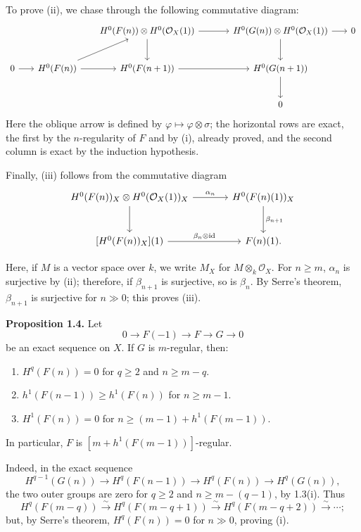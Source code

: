 To prove (ii), we chase through the following commutative diagram:
\[
\begin{tikzcd}[column sep=1.7em,row sep=2.4em]
  & & H^0(F(n))\otimes H^0(\mathcal O_X(1))
      \arrow[rr] \arrow[d]
  & & H^0(G(n))\otimes H^0(\mathcal O_X(1))
      \arrow[r] \arrow[d]
  & 0 \\
  0 \arrow[r]
  & H^0(F(n)) \arrow[ur] \arrow[r]
  & H^0(F(n+1)) \arrow[rr]
  & & H^0(G(n+1)) \arrow[d] \\
  & & & & 0
\end{tikzcd}
\]
Here the oblique arrow is defined by
\(\varphi\mapsto\varphi\otimes\sigma\); the horizontal rows are exact, the
first by the \(n\)-regularity of \(F\) and by (i), already proved, and the
second column is exact by the induction hypothesis.

Finally, (iii) follows from the commutative diagram
\[
\begin{tikzcd}[column sep=large,row sep=large]
H^0(F(n))_X\otimes H^0(\mathcal O_X(1))_X
  \arrow[r,"\alpha_n"]
  \arrow[d]
& H^0(F(n)(1))_X
  \arrow[d,"\beta_{n+1}"] \\
{[H^0(F(n))_X](1)}
  \arrow[r,"\beta_n\otimes\mathrm{id}"]
& F(n)(1).
\end{tikzcd}
\]

\newpage
Here, if \(M\) is a vector space over \(k\), we write \(M_X\) for
\(M\otimes_k\mathcal O_X\). For \(n\geq m\), \(\alpha_n\) is surjective
by (ii); therefore, if \(\beta_{n+1}\) is surjective, so is \(\beta_n\). By
Serre's theorem, \(\beta_{n+1}\) is surjective for \(n\gg0\); this proves
(iii).

\textbf{Proposition 1.4.} Let
\[
  0\longrightarrow F(-1)\longrightarrow F\longrightarrow G\longrightarrow0
\]
be an exact sequence on \(X\). If \(G\) is \(m\)-regular, then:
\begin{enumerate}[label=(\roman*)]
\item \(H^q(F(n))=0\) for \(q\geq2\) and \(n\geq m-q\).
\item \(h^1(F(n-1))\geq h^1(F(n))\) for \(n\geq m-1\).
\item \(H^1(F(n))=0\) for
\(n\geq(m-1)+h^1(F(m-1))\).
\end{enumerate}
In particular, \(F\) is \([m+h^1(F(m-1))]\)-regular.

Indeed, in the exact sequence
\[
  H^{q-1}(G(n))\longrightarrow H^q(F(n-1))
  \longrightarrow H^q(F(n))\longrightarrow H^q(G(n)),
\]
the two outer groups are zero for \(q\geq2\) and
\(n\geq m-(q-1)\), by 1.3(i). Thus
\[
  H^q(F(m-q))\xrightarrow{\sim}H^q(F(m-q+1))
  \xrightarrow{\sim}H^q(F(m-q+2))\xrightarrow{\sim}\cdots;
\]
but, by Serre's theorem, \(H^q(F(n))=0\) for \(n\gg0\), proving (i).

